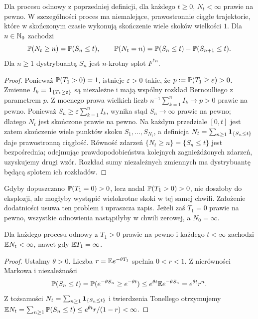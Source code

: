 \begin{twierdzenie}
Dla procesu odnowy z poprzedniej definicji, dla każdego $t\ge0$,
$N_t<\infty$ prawie na pewno. W szczególności proces ma
niemalejące, prawostronnie ciągłe trajektorie, które w skończonym
czasie wykonują skończenie wiele skoków wielkości $1$.
Dla $n\in\mathbb{N}_0$ zachodzi
\[
\mathbb{P}(N_t\ge n)=\mathbb{P}(S_n\le t),\qquad
\mathbb{P}(N_t=n)=\mathbb{P}(S_n\le t)-\mathbb{P}(S_{n+1}\le t).
\]
Dla $n\ge1$ dystrybuantą $S_n$ jest $n$-krotny splot $F^{*n}$.
\end{twierdzenie}
\begin{proof}
Ponieważ $\mathbb{P}(T_1>0)=1$, istnieje $\varepsilon>0$
takie, że $p:=\mathbb{P}(T_1\ge\varepsilon)>0$.
Zmienne $I_k=\mathbf{1}_{\{T_k\ge\varepsilon\}}$ są niezależne
i mają wspólny rozkład Bernoulliego z parametrem $p$.
Z mocnego prawa wielkich liczb
$n^{-1}\sum_{k=1}^n I_k\to p>0$ prawie na pewno.
Ponieważ $S_n\ge\varepsilon\sum_{k=1}^nI_k$, wynika stąd
$S_n\to\infty$ prawie na pewno; dlatego $N_t$ jest skończone
prawie na pewno. Na każdym przedziale $[0,t]$ jest zatem
skończenie wiele punktów skoku $S_1,\dots,S_{N_t}$,
a definicja $N_t=\sum_{n\ge1}\mathbf{1}_{\{S_n\le t\}}$
daje prawostronną ciągłość.
Równość zdarzeń $\{N_t\ge n\}=\{S_n\le t\}$ jest bezpośrednia;
odejmując prawdopodobieństwa kolejnych zagnieżdżonych zdarzeń,
uzyskujemy drugi wzór. Rozkład sumy niezależnych zmiennych
ma dystrybuantę będącą splotem ich rozkładów.
\end{proof}

\begin{uwaga}
Gdyby dopuszczano $\mathbb{P}(T_1=0)>0$, lecz nadal
$\mathbb{P}(T_1>0)>0$, nie doszłoby do eksplozji, ale mogłyby
wystąpić wielokrotne skoki w tej samej chwili.
Założenie dodatniości usuwa ten problem i upraszcza zapis.
Jeżeli zaś $T_1=0$ prawie na pewno, wszystkie odnowienia
nastąpiłyby w chwili zerowej, a $N_0=\infty$.
\end{uwaga}

\begin{stwierdzenie}
Dla każdego procesu odnowy z $T_1>0$ prawie na pewno i każdego
$t<\infty$ zachodzi $\mathbb{E} N_t<\infty$, nawet gdy $\mathbb{E} T_1=\infty$.
\end{stwierdzenie}
\begin{proof}
Ustalmy $\theta>0$. Liczba
$r=\mathbb{E} e^{-\theta T_1}$ spełnia $0<r<1$.
Z nierówności Markowa i niezależności
\[
\mathbb{P}(S_n\le t)=\mathbb{P}(e^{-\theta S_n}\ge e^{-\theta t})
\le e^{\theta t}\mathbb{E} e^{-\theta S_n}=e^{\theta t}r^n.
\]
Z tożsamości $N_t=\sum_{n\ge1}\mathbf{1}_{\{S_n\le t\}}$
i twierdzenia Tonellego otrzymujemy
$\mathbb{E} N_t=\sum_{n\ge1}\mathbb{P}(S_n\le t)
\le e^{\theta t}r/(1-r)<\infty$.
\end{proof}

